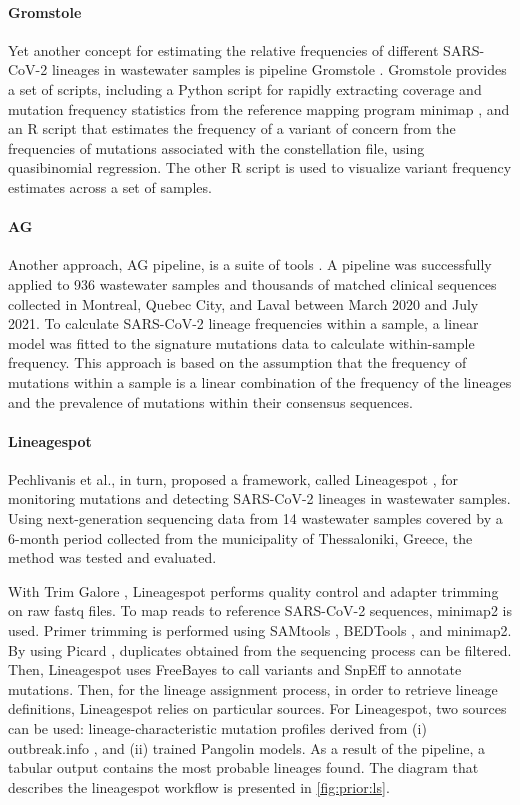         \paragraph{Gromstole}
        Yet another concept for estimating the relative frequencies of different SARS-CoV-2 lineages in wastewater samples is pipeline Gromstole \cite{gromstole2022}. Gromstole provides a set of scripts, including a Python script for rapidly extracting coverage and mutation frequency statistics from the reference mapping program minimap \cite{li2018}, and an R script that estimates the frequency of a variant of concern from the frequencies of mutations associated with the constellation file, using quasibinomial regression. The other R script is used to visualize variant frequency estimates across a set of samples.
        \paragraph{AG}
        Another approach, AG pipeline, is a suite of tools \cite{nguessan2022}. A pipeline was successfully applied to 936 wastewater samples and thousands of matched clinical sequences collected in Montreal, Quebec City, and Laval between March 2020 and July 2021. To calculate SARS-CoV-2 lineage frequencies within a sample, a linear model was fitted to the signature mutations data to calculate within-sample frequency. This approach is based on the assumption that the frequency of mutations within a sample is a linear combination of the frequency of the lineages and the prevalence of mutations within their consensus sequences. 
        \paragraph{Lineagespot}
        Pechlivanis et al., in turn, proposed a framework, called Lineagespot \cite{pechlivanis2022}, for monitoring mutations and detecting SARS-CoV-2 lineages in wastewater samples. Using next-generation sequencing data from 14 wastewater samples covered by a 6-month period collected from the municipality of Thessaloniki, Greece, the method was tested and evaluated. 

        With Trim Galore \cite{krueger2021}, Lineagespot performs quality control and adapter trimming on raw \acrshort{fastq} files. To map reads to reference SARS-CoV-2 sequences, minimap2 \cite{li2018} is used. Primer trimming is performed using SAMtools \cite{li2009}, BEDTools \cite{bedtools}, and minimap2. By using Picard \cite{picard}, duplicates obtained from the sequencing process can be filtered. Then, Lineagespot uses FreeBayes \cite{garrison2012} to call variants and SnpEff \cite{snpeff} to annotate mutations. Then, for the lineage assignment process, in order to retrieve lineage definitions, Lineagespot relies on particular sources. For Lineagespot, two sources can be used: lineage-characteristic mutation profiles derived from (i) outbreak.info \cite{outbreakinfo}, and (ii) trained Pangolin \cite{otoole2021} models. As a result of the pipeline, a tabular output contains the most probable lineages found. The diagram that describes the lineagespot workflow is presented in \cref{fig:prior:ls}.
        
